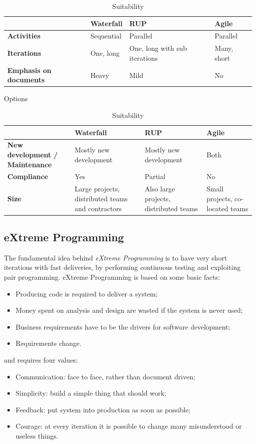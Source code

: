 \begin{table}
\centering
\small
\begin{tabularx}{0.95\textwidth}{X|X|X|X}
& \textbf{Waterfall} & \textbf{RUP} & \textbf{Agile} \\
\hline
\textbf{Activities} & Sequential & Parallel & Parallel \\
\hline
\textbf{Iterations} & One, long & One, long with sub iterations & Many, short \\
\hline
\textbf{Emphasis on documents} & Heavy & Mild & No \\
\end{tabularx}
\caption{Options}

\begin{tabularx}{0.95\textwidth}{X|X|X|X}
& \textbf{Waterfall} & \textbf{RUP} & \textbf{Agile} \\
\hline
\textbf{New development / Maintenance} & Mostly new development & Mostly new development & Both \\
\hline
\textbf{Compliance} & Yes & Partial & No \\
\hline
\textbf{Size} & Large projects, distributed teams and contractors & Also large projects, distributed teams & Small projects, co-located teams \\
\end{tabularx}
\caption{Suitability}
\end{table}

\subsection{eXtreme Programming}
The fundamental idea behind \emph{eXtreme Programming} is to have very short iterations with fast deliveries, by performing continuous testing and exploiting pair programming. eXtreme Programming is based on some basic facts:
\begin{itemize}
\item Producing code is required to deliver a system;
\item Money spent on analysis and design are wasted if the system is never used;
\item Business requirements have to be the drivers for software development;
\item Requirements change.
\end{itemize}
and requires four values:
\begin{itemize}
\item Communication: face to face, rather than document driven;
\item Simplicity: build a simple thing that should work;
\item Feedback: put system into production as soon as possible;
\item Courage: at every iteration it is possible to change many misunderstood or useless things.
\end{itemize}

